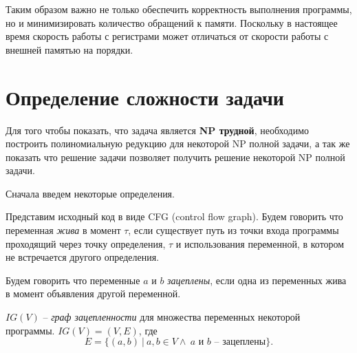Таким образом важно не только обеспечить корректность выполнения программы, но и минимизировать количество обращений к памяти.
Поскольку в настоящее время скорость работы с регистрами может отличаться от скорости работы с внешней памятью на порядки.

\section{Определение сложности задачи} %

\label{seg:complexity}

Для того чтобы показать, что задача является \textbf{NP трудной}, необходимо построить полиномиальную редукцию
для некоторой NP полной задачи, а так же показать что решение задачи позволяет получить решение некоторой
NP полной задачи.

Сначала введем некоторые определения.


\begin{definition}

    \label{def:liveness} %

    Представим исходный код в виде CFG (control flow graph).
    Будем говорить что переменная \textit{жива} в момент $\tau$, если существует путь из точки входа
    программы проходящий через точку определения, $\tau$ и использования переменной, в котором не встречается другого определения.

\end{definition}

\begin{definition}

    Будем говорить что переменные $a$ и $b$ \textit{зацеплены}, если одна из переменных жива в момент объявления
    другой переменной.

\end{definition}

\begin{definition}

    $IG(V)$ -- \textit{граф зацепленности} для множества переменных некоторой программы.
    $IG(V) = (V, E)$, где $$E = \{(a, b) \ | \  a, b \in V \land \ a \text{ и } b \text{ -- зацеплены}\}.$$

\end{definition}

